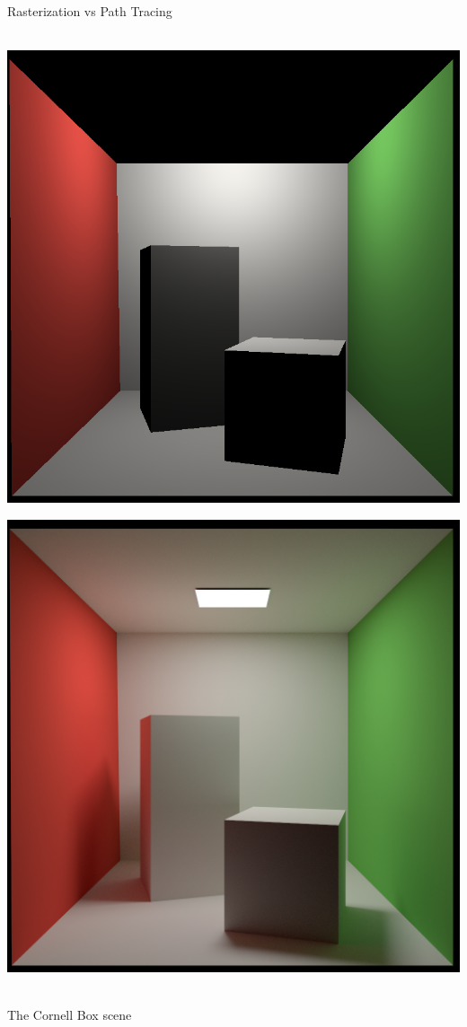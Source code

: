 \documentclass[utf8,stillsansserifmath,fleqn,t]{beamer}
\begin{document}
\begin{frame}
\frametitle{\insertsection}
Rasterization vs Path Tracing\\~\\
\begin{minipage}{.48\textwidth}
\includegraphics[width=\textwidth]{./fig/cornellbox-rasterization.png}
\end{minipage}\hfill
\begin{minipage}{.48\textwidth}
\includegraphics[width=\textwidth]{./fig/cornellbox-pathtracing.png}
\end{minipage}\\\vfill
The Cornell Box scene
\end{frame}
\end{document}
